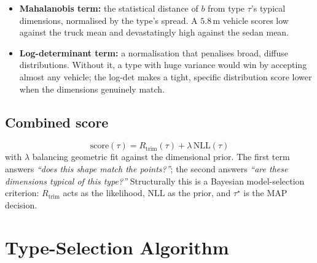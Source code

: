 \documentclass[11pt]{article}
\newcommand{\Rtrim}{R_{\text{trim}}}
\newcommand{\NLL}{\text{NLL}}
\theoremstyle{definition}
\begin{document}
\begin{itemize}[leftmargin=2em]
    \item \textbf{Mahalanobis term:} the statistical distance of $b$ from type $\tau$'s typical dimensions, normalised by the type's spread. A $5.8$\,m vehicle scores low against the truck mean and devastatingly high against the sedan mean.
    \item \textbf{Log-determinant term:} a normalisation that penalises broad, diffuse distributions. Without it, a type with huge variance would win by accepting almost any vehicle; the log-det makes a tight, specific distribution score lower when the dimensions genuinely match.
\end{itemize}

\subsection{Combined score}

\begin{equation}
\boxed{\ \text{score}(\tau) = \Rtrim(\tau) + \lambda\,\NLL(\tau)\ }
\label{eq:score}
\end{equation}
with $\lambda$ balancing geometric fit against the dimensional prior. The first term answers \emph{``does this shape match the points?''}; the second answers \emph{``are these dimensions typical of this type?''} Structurally this is a Bayesian model-selection criterion: $\Rtrim$ acts as the likelihood, $\NLL$ as the prior, and $\tau^\star$ is the MAP decision.

\section{Type-Selection Algorithm}
\end{document}
